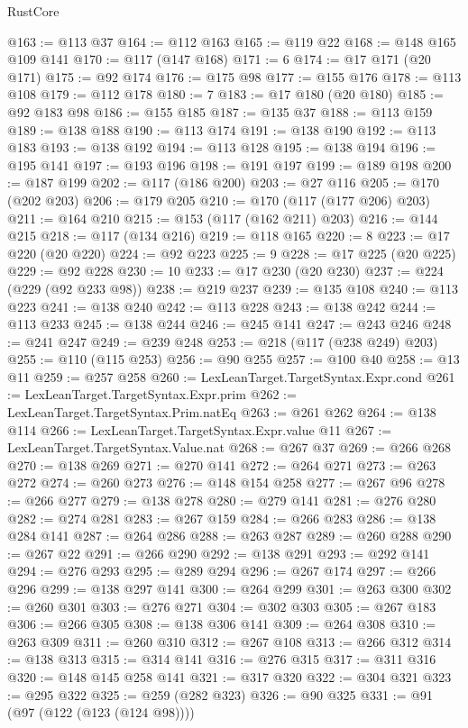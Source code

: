 \begin{lexlean}{RustCore}
\begin{coremodule}
@163 := @113 @37
@164 := @112 @163
@165 := @119 @22
@168 := @148 @165 @109 @141
@170 := @117 (@147 @168)
@171 := 6
@174 := @17 @171 (@20 @171)
@175 := @92 @174
@176 := @175 @98
@177 := @155 @176
@178 := @113 @108
@179 := @112 @178
@180 := 7
@183 := @17 @180 (@20 @180)
@185 := @92 @183 @98
@186 := @155 @185
@187 := @135 @37
@188 := @113 @159
@189 := @138 @188
@190 := @113 @174
@191 := @138 @190
@192 := @113 @183
@193 := @138 @192
@194 := @113 @128
@195 := @138 @194
@196 := @195 @141
@197 := @193 @196
@198 := @191 @197
@199 := @189 @198
@200 := @187 @199
@202 := @117 (@186 @200)
@203 := @27 @116
@205 := @170 (@202 @203)
@206 := @179 @205
@210 := @170 (@117 (@177 @206) @203)
@211 := @164 @210
@215 := @153 (@117 (@162 @211) @203)
@216 := @144 @215
@218 := @117 (@134 @216)
@219 := @118 @165
@220 := 8
@223 := @17 @220 (@20 @220)
@224 := @92 @223
@225 := 9
@228 := @17 @225 (@20 @225)
@229 := @92 @228
@230 := 10
@233 := @17 @230 (@20 @230)
@237 := @224 (@229 (@92 @233 @98))
@238 := @219 @237
@239 := @135 @108
@240 := @113 @223
@241 := @138 @240
@242 := @113 @228
@243 := @138 @242
@244 := @113 @233
@245 := @138 @244
@246 := @245 @141
@247 := @243 @246
@248 := @241 @247
@249 := @239 @248
@253 := @218 (@117 (@238 @249) @203)
@255 := @110 (@115 @253)
@256 := @90 @255
@257 := @100 @40
@258 := @13 @11
@259 := @257 @258
@260 := LexLeanTarget.TargetSyntax.Expr.cond
@261 := LexLeanTarget.TargetSyntax.Expr.prim
@262 := LexLeanTarget.TargetSyntax.Prim.natEq
@263 := @261 @262
@264 := @138 @114
@266 := LexLeanTarget.TargetSyntax.Expr.value @11
@267 := LexLeanTarget.TargetSyntax.Value.nat
@268 := @267 @37
@269 := @266 @268
@270 := @138 @269
@271 := @270 @141
@272 := @264 @271
@273 := @263 @272
@274 := @260 @273
@276 := @148 @154 @258
@277 := @267 @96
@278 := @266 @277
@279 := @138 @278
@280 := @279 @141
@281 := @276 @280
@282 := @274 @281
@283 := @267 @159
@284 := @266 @283
@286 := @138 @284 @141
@287 := @264 @286
@288 := @263 @287
@289 := @260 @288
@290 := @267 @22
@291 := @266 @290
@292 := @138 @291
@293 := @292 @141
@294 := @276 @293
@295 := @289 @294
@296 := @267 @174
@297 := @266 @296
@299 := @138 @297 @141
@300 := @264 @299
@301 := @263 @300
@302 := @260 @301
@303 := @276 @271
@304 := @302 @303
@305 := @267 @183
@306 := @266 @305
@308 := @138 @306 @141
@309 := @264 @308
@310 := @263 @309
@311 := @260 @310
@312 := @267 @108
@313 := @266 @312
@314 := @138 @313
@315 := @314 @141
@316 := @276 @315
@317 := @311 @316
@320 := @148 @145 @258 @141
@321 := @317 @320
@322 := @304 @321
@323 := @295 @322
@325 := @259 (@282 @323)
@326 := @90 @325
@331 := @91 (@97 (@122 (@123 (@124 @98))))

\end{coremodule}
\end{lexlean}
